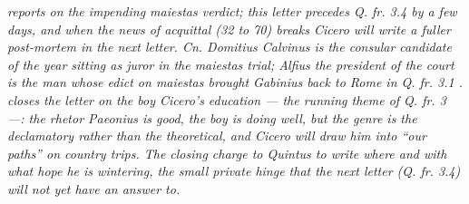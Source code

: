 \textit{ reports on the impending \textit{maiestas}
verdict; this letter precedes Q. fr. 3.4 by a few days, and
when the news of acquittal (32 to 70) breaks Cicero will
write a fuller post-mortem in the next letter. Cn. Domitius
Calvinus is the consular candidate of the year sitting as
juror in the \textit{maiestas} trial; Alfius the president of
the court is the man whose edict on \textit{maiestas} brought
Gabinius back to Rome in Q. fr. 3.1 .
 closes the letter on the boy Cicero's
education --- the running theme of Q. fr. 3 ---: the rhetor
Paeonius is good, the boy is doing well, but the genre is
the declamatory rather than the theoretical, and Cicero will
draw him into ``our paths'' on country trips. The closing
charge to Quintus to write where and with what hope he is
wintering, the small private hinge that the next letter
(Q. fr. 3.4) will not yet have an answer to.}
